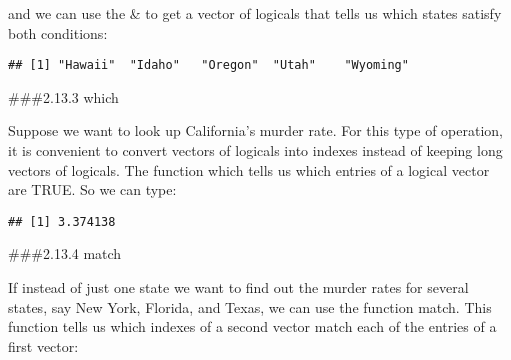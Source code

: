 \documentclass[
]{article}
\newenvironment{Shaded}{\begin{snugshade}}{\end{snugshade}}
\newcommand{\FunctionTok}[1]{\textcolor[rgb]{0.00,0.00,0.00}{#1}}
\newcommand{\NormalTok}[1]{#1}
\newcommand{\OtherTok}[1]{\textcolor[rgb]{0.56,0.35,0.01}{#1}}
\newcommand{\SpecialCharTok}[1]{\textcolor[rgb]{0.00,0.00,0.00}{#1}}
\newcommand{\StringTok}[1]{\textcolor[rgb]{0.31,0.60,0.02}{#1}}
\begin{document}
and we can use the \& to get a vector of logicals that tells us which
states satisfy both conditions:

\begin{Shaded}
\end{Shaded}

\begin{verbatim}
## [1] "Hawaii"  "Idaho"   "Oregon"  "Utah"    "Wyoming"
\end{verbatim}

\#\#\#2.13.3 which

Suppose we want to look up California's murder rate. For this type of
operation, it is convenient to convert vectors of logicals into indexes
instead of keeping long vectors of logicals. The function which tells us
which entries of a logical vector are TRUE. So we can type:

\begin{Shaded}
\end{Shaded}

\begin{verbatim}
## [1] 3.374138
\end{verbatim}

\#\#\#2.13.4 match

If instead of just one state we want to find out the murder rates for
several states, say New York, Florida, and Texas, we can use the
function match. This function tells us which indexes of a second vector
match each of the entries of a first vector:

\begin{Shaded}
\end{Shaded}
\end{document}
